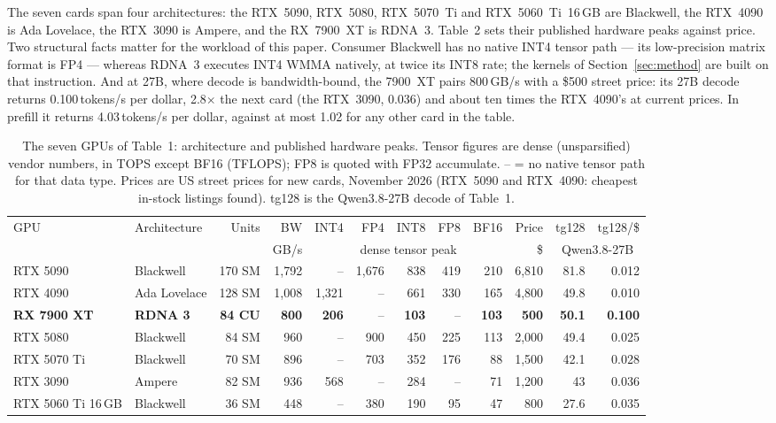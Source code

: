 \documentclass[10.5pt,a4paper]{article}
\begin{document}
The seven cards span four architectures: the RTX~5090, RTX~5080, RTX~5070~Ti and RTX~5060~Ti~16\,GB are Blackwell, the RTX~4090 is Ada Lovelace, the RTX~3090 is Ampere, and the RX~7900~XT is
RDNA~3. Table~2 sets their published hardware peaks against price. Two structural facts matter for the workload of this paper. Consumer Blackwell has no native INT4 tensor path --- its
low-precision matrix format is FP4 --- whereas RDNA~3 executes INT4 WMMA natively, at twice its INT8 rate; the kernels of Section~\ref{sec:method} are built on that instruction. And at 27B, where
decode is bandwidth-bound, the 7900~XT pairs 800\,GB/s with a \$500 street price: its 27B decode returns 0.100\,tokens/s per dollar, 2.8$\times$ the next card (the RTX~3090, 0.036) and about ten
times the RTX~4090's at current prices. In prefill it returns 4.03\,tokens/s per dollar, against at most 1.02 for any other card in the table.

\begin{table}[H]
\centering\scriptsize\setlength{\tabcolsep}{3pt}
\begin{tabular}{@{}llrrrrrrrrrr@{}}
\toprule
GPU & Architecture & Units & BW & INT4 & FP4 & INT8 & FP8 & BF16 & Price & tg128 & tg128/\$\\
 & & & GB/s & \multicolumn{5}{c}{dense tensor peak} & \$ & \multicolumn{2}{c}{Qwen3.8-27B}\\
\midrule
RTX 5090 & Blackwell & 170 SM & 1{,}792 & -- & 1{,}676 & 838 & 419 & 210 & 6{,}810 & 81.8 & 0.012\\
RTX 4090 & Ada Lovelace & 128 SM & 1{,}008 & 1{,}321 & -- & 661 & 330 & 165 & 4{,}800 & 49.8 & 0.010\\
\textbf{RX 7900 XT} & \textbf{RDNA 3} & \textbf{84 CU} & \textbf{800} & \textbf{206} & -- & \textbf{103} & -- & \textbf{103} & \textbf{500} & \textbf{50.1} & \textbf{0.100}\\
RTX 5080 & Blackwell & 84 SM & 960 & -- & 900 & 450 & 225 & 113 & 2{,}000 & 49.4 & 0.025\\
RTX 5070 Ti & Blackwell & 70 SM & 896 & -- & 703 & 352 & 176 & 88 & 1{,}500 & 42.1 & 0.028\\
RTX 3090 & Ampere & 82 SM & 936 & 568 & -- & 284 & -- & 71 & 1{,}200 & 43 & 0.036\\
RTX 5060 Ti 16\,GB & Blackwell & 36 SM & 448 & -- & 380 & 190 & 95 & 47 & 800 & 27.6 & 0.035\\
\bottomrule
\end{tabular}
\caption{The seven GPUs of Table~1: architecture and published hardware peaks. Tensor figures are dense (unsparsified) vendor numbers, in TOPS except BF16 (TFLOPS); FP8 is quoted with FP32 accumulate. -- = no native tensor path for that data type. Prices are US street prices for new cards, November 2026 (RTX~5090 and RTX~4090: cheapest in-stock listings found). tg128 is the Qwen3.8-27B decode of Table~1.}
\end{table}
\end{document}
